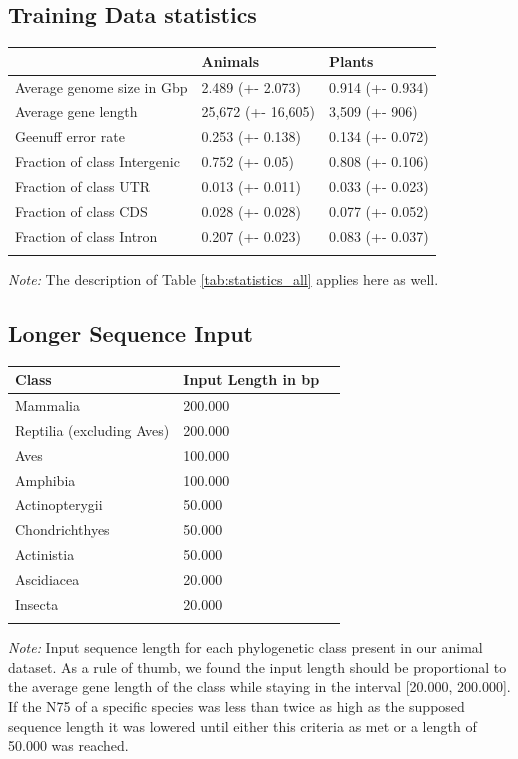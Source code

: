 \documentclass{bioinfo}
\begin{document}
\subsection{Training Data statistics}
\label{sec:training_data}
\begin{table}[!t]
 {
\begin{tabular}{@{}lll@{}}
\toprule & Animals & Plants\\
\midrule
Average genome size in Gbp& 2.489 (+- 2.073) & 0.914 (+- 0.934) \\
Average gene length & 25,672 (+- 16,605) & 3,509 (+- 906)\\
Geenuff error rate & 0.253 (+- 0.138) & 0.134 (+- 0.072) \\
Fraction of class Intergenic & 0.752 (+- 0.05) & 0.808 (+- 0.106) \\
Fraction of class UTR & 0.013 (+- 0.011) & 0.033 (+- 0.023) \\
Fraction of class CDS & 0.028 (+- 0.028) & 0.077 (+- 0.052) \\
Fraction of class Intron  & 0.207 (+- 0.023) & 0.083 (+- 0.037) \\
\botrule
\end{tabular}}{{\it Note:} The description of Table \ref{tab:statistics_all} applies here as well.}
\end{table}

\subsection{Longer Sequence Input}
\label{sec:longer}
\begin{table}[!t]
 {
\begin{tabular}{@{}lll@{}}
\toprule Class & Input Length in bp\\
\midrule
Mammalia & 200.000 \\
Reptilia (excluding Aves) & 200.000 \\
Aves & 100.000 \\
Amphibia & 100.000 \\
Actinopterygii & 50.000 \\
Chondrichthyes & 50.000 \\
Actinistia & 50.000 \\
Ascidiacea & 20.000 \\
Insecta & 20.000 \\
\botrule
\end{tabular}}{{\it Note:} Input sequence length for each phylogenetic class present in our animal dataset. As a rule of thumb, we found the input length should be proportional to the average gene length of the class while staying in the interval [20.000, 200.000]. If the N75 of a specific species was less than twice as high as the supposed sequence length it was lowered until either this criteria as met or a length of 50.000 was reached. }
\end{table}
\end{document}
